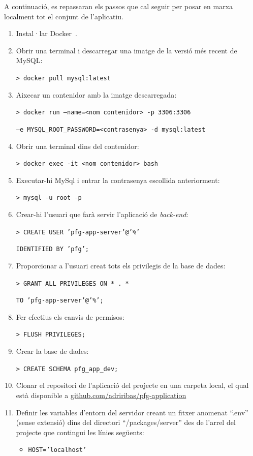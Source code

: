\documentclass[a4paper,12pt]{ThesisStyle}
\begin{document}
A continuació, es repassaran els passos que cal seguir per posar en marxa localment tot el conjunt de l'aplicatiu.
\begin{enumerate}
  \item Instal·lar Docker~\cite{Docker}.
  \item Obrir una terminal i descarregar una imatge de la versió més recent de MySQL:\\
    \centerline{\texttt{> docker pull mysql:latest}}
  \item Aixecar un contenidor amb la imatge descarregada:\\
    \centerline{\texttt{> docker run ---name=<nom contenidor> -p 3306:3306}}
    \centerline{\texttt{--e MYSQL\_ROOT\_PASSWORD=<contrasenya> -d mysql:latest}}
  \item Obrir una terminal dins del contenidor:\\
    \centerline{\texttt{> docker exec -it <nom contenidor> bash}}
  \item Executar-hi MySql i entrar la contrasenya escollida anteriorment:\\
    \centerline{\texttt{> mysql -u root -p}}
  \item Crear-hi l'usuari que farà servir l'aplicació de \textit{back-end}:\\
    \centerline{\texttt{> CREATE USER 'pfg-app-server'@'\%'}}
    \centerline{\texttt{IDENTIFIED BY 'pfg';}}
  \item Proporcionar a l'usuari creat tots els privilegis de la base de dades:\\
    \centerline{\texttt{> GRANT ALL PRIVILEGES ON * . *}}
    \centerline{\texttt{TO 'pfg-app-server'@'\%';}}
  \item Fer efectius els canvis de permisos:\\
    \centerline{\texttt{> FLUSH PRIVILEGES;}}
  \item Crear la base de dades:\\
    \centerline{\texttt{> CREATE SCHEMA pfg\_app\_dev;}}
  \item Clonar el repositori de l'aplicació del projecte en una carpeta local, el qual està disponible a \href{https://github.com/adriribas/pfg-application}{github.com/adriribas/pfg-application}
  \item Definir les variables d'entorn del servidor creant un fitxer anomenat ``.env'' (sense extensió) dins del directori ``/packages/server'' des de l'arrel del projecte que contingui les línies següents:
  \begin{itemize}
    \item \texttt{HOST='localhost'}

\end{itemize}
\end{enumerate}
\end{document}
